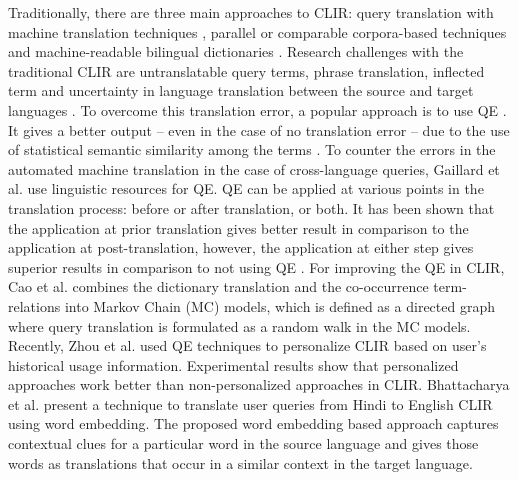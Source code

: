 Traditionally, there are three main approaches to CLIR: query translation with machine translation techniques \cite{radwan1994vers}, parallel or comparable corpora-based techniques \cite{sheridan1996experiments} and machine-readable bilingual dictionaries \cite{ballesteros1996dictionary}. Research challenges with the traditional CLIR are untranslatable query terms, phrase translation, inflected term and uncertainty in language translation between the source and target languages \cite{pirkola2001dictionary}. To overcome this translation error, a popular approach is to use QE \cite{ballesteros1997phrasal,nie1999cross}. It gives a better output -- even in the case of no translation error -- due to the use of statistical semantic similarity among the terms \cite{adriani1999term,kraaij2003embedding}. To counter the errors in the automated machine translation in the case of cross-language queries, Gaillard et al. \cite{gaillard2010query} use linguistic resources for QE. QE can be applied at various points in the translation process: before or after translation, or both. It has been shown that the application at prior translation gives better result in comparison to the application at post-translation, however, the application at either step gives superior results in comparison to not using QE \cite{ballesteros1998resolving,ballesteros2002cross,mcnamee2002comparing,levow2005dictionary}. For improving the QE in CLIR, Cao et al. \cite{cao2007extending} combines the dictionary translation and the co-occurrence term-relations into Markov Chain (MC) models, which is defined as a directed graph where query translation is formulated as a random walk in the MC models. Recently, Zhou et al.  \cite{zhou2015query,zhou2016study} used QE techniques to personalize CLIR based on user's historical usage information. Experimental results show that personalized approaches work better than non-personalized approaches in CLIR.  Bhattacharya et al.  \cite{bhattacharya2016usingword} present a technique to translate user queries from Hindi to English CLIR using word embedding. The proposed word embedding based approach captures contextual clues for a particular word in the source language and gives those words as translations that occur in a similar context in the target language.

